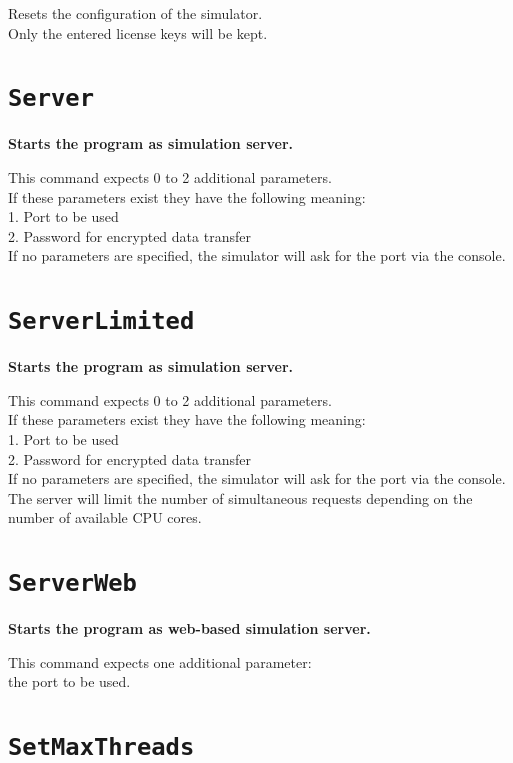 Resets the configuration of the simulator.\\
Only the entered license keys will be kept.

\section{\texttt{Server}}

\textbf{Starts the program as simulation server.}

This command expects 0 to 2 additional parameters.\\
If these parameters exist they have the following meaning:\\
1. Port to be used\\
2. Password for encrypted data transfer\\
If no parameters are specified, the simulator will ask for the port via the console.

\section{\texttt{ServerLimited}}

\textbf{Starts the program as simulation server.}

This command expects 0 to 2 additional parameters.\\
If these parameters exist they have the following meaning:\\
1. Port to be used\\
2. Password for encrypted data transfer\\
If no parameters are specified, the simulator will ask for the port via the console.\\
The server will limit the number of simultaneous requests depending on the\\
number of available CPU cores.

\section{\texttt{ServerWeb}}

\textbf{Starts the program as web-based simulation server.}

This command expects one additional parameter:\\
the port to be used.

\section{\texttt{SetMaxThreads}}

